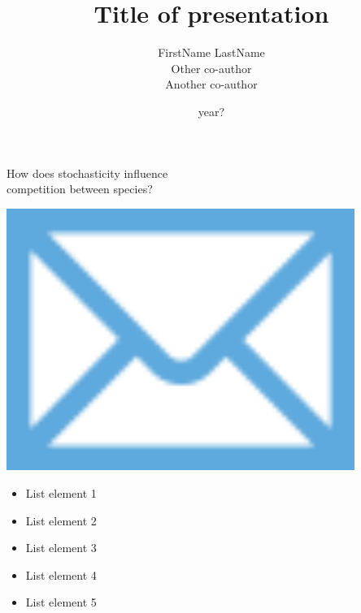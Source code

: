 \documentclass[12pt]{beamer}
\title{\large Title of presentation }
\subtitle{\normalsize FirstName LastName \\ Other co-author \\ Another co-author }
\date{year?}
\begin{document}
\maketitle


\begin{frame}
	\vspace{0.75cm}
  \begin{flushright}
	{\Large \textcolor{boss3}{How does stochasticity influence \\ competition between species?}} 
  \end{flushright}
\end{frame}






\begin{frame}
  \begin{center}
	  \includegraphics[width=0.85\textwidth]{figs/email.png} 
	\end{center}
\end{frame}






\begin{frame}

  \begin{itemize}
    \item \textcolor{boss1}{List element 1}

    \item \textcolor{boss2}{List element 2}

    \item \textcolor{boss3}{List element 3}

    \item \textcolor{boss4}{List element 4}

    \item \textcolor{boss5}{List element 5}

  \end{itemize}
\end{frame}
\end{document}
